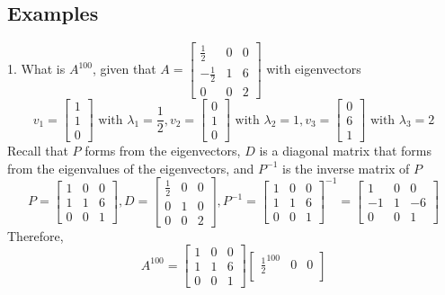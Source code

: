 \begin{enumerate}
\subsection{Examples}
1. What is $A^{100}$, given that $A = \begin{bmatrix} \frac{1}{2} & 
0 & 0 \\ -\frac{1}{2} & 1 & 6 \\ 0 & 0 & 2 \end{bmatrix}$ with 
eigenvectors 
\[
  v_1 = \begin{bmatrix} 1 \\ 1 \\ 0 \end{bmatrix} \text{ with }
  \lambda_1 = \frac{1}{2}, v_2 = \begin{bmatrix} 0 \\ 1 \\ 0 
  \end{bmatrix} \text{ with } \lambda_2 = 1, v_3 = \begin{bmatrix}
  0 \\ 6 \\ 1 \end{bmatrix} \text{ with } \lambda_3 = 2
\] 
Recall that $P$ forms from the eigenvectors, $D$ is a diagonal matrix that 
forms from the eigenvalues of the eigenvectors, and $P^{-1}$ 
is the inverse matrix of $P$
\[
  P = \begin{bmatrix} 1 & 0 & 0 \\ 1 & 1 & 6 \\ 0 & 0 & 1 
    \end{bmatrix}, D = \begin{bmatrix} \frac{1}{2} & 0 & 0 \\ 
  0 & 1 & 0 \\ 0 & 0 & 2 \end{bmatrix},
    P^{-1} = \begin{bmatrix} 1 & 0 & 0 \\ 1 & 1 & 6 \\ 0 & 0 & 1 \end{bmatrix}^{-1} = \begin{bmatrix} 1 & 0 & 0 \\ -1 & 1 & -6 \\ 
  0 & 0 & 1 \end{bmatrix}
\]
Therefore,
\[
  A^{100} = \begin{bmatrix} 1 & 0 & 0 \\ 1 & 1 & 6 \\ 0 & 0 & 1 
  \end{bmatrix} \begin{bmatrix} \frac{1}{2}^{100} & 0 & 0 \\ 

\end{bmatrix}\]
\end{enumerate}
